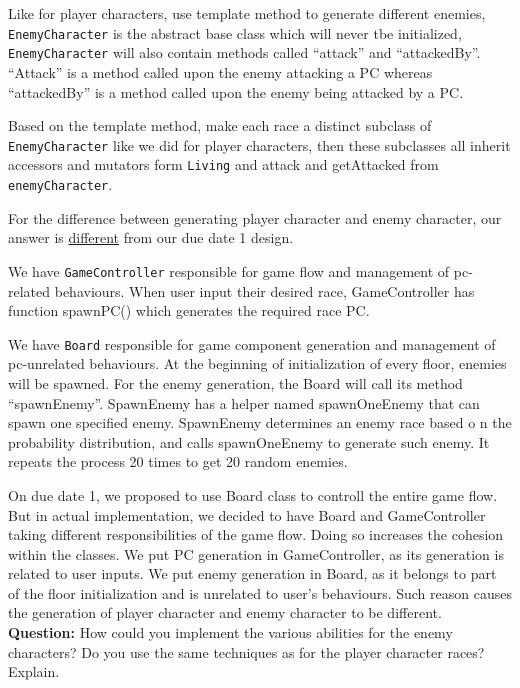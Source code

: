 \documentclass[11pt]{article}
\theoremstyle{plain} \newtheorem{theorem*}{Theorem}[subsection]
\begin{document}
Like for player characters, use template method to generate different enemies,
\texttt{EnemyCharacter} is the abstract base class which will
never tbe initialized, \texttt{EnemyCharacter} will also contain methods called
“attack” and “attackedBy”. 
“Attack” is a method called upon the enemy attacking a PC whereas
“attackedBy” is a method called upon the enemy being attacked by a PC. 

Based on the template method, make each race a 
distinct subclass of \texttt{EnemyCharacter} like we did for player characters,
then these subclasses all inherit accessors and
mutators form \texttt{Living} and \textsf{attack} and \textsf{getAttacked}
from \texttt{enemyCharacter}.


For the difference between generating player character and enemy character,
our answer is \underline{different} from our due date 1 design. 


We have \texttt{GameController} responsible for game flow and
management of pc-related behaviours. When user input their desired race,
GameController has function \textsf{spawnPC()} which generates
the required race PC.  

We have \texttt{Board} responsible for game component generation
and management of pc-unrelated behaviours. At the beginning of initialization
of every floor, enemies will be spawned. For the enemy generation, the Board
will call its method “spawnEnemy”. SpawnEnemy has a helper named spawnOneEnemy
that can spawn one specified enemy. SpawnEnemy determines an enemy race based o
n the probability distribution, and calls spawnOneEnemy to generate such enemy.
It repeats the process 20 times to get 20 random enemies. 

On due date 1, we proposed to use Board class to controll the entire game flow.
But in actual implementation, we decided to have Board and GameController
taking different responsibilities of the game flow. Doing so increases the
cohesion within the classes. We put PC generation in GameController, as its
generation is related to user inputs. We put enemy generation in Board, as it
belongs to part of the floor initialization and is unrelated to user’s
behaviours. Such reason causes the generation of player character and enemy
character to be different. \\

\textbf{Question:}
How could you implement the various abilities for the enemy characters? Do you
use the same techniques as for the player character races? Explain. 
\end{document}
